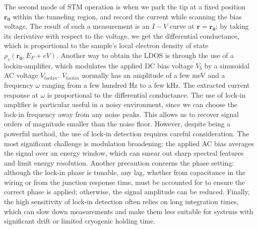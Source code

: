 The second mode of \ac{STM} operation is when we park the tip at a fixed position $\mathbf{r_0}$ within the tunneling region, and record the current while scanning the bias voltage. The result of such a measurement is an $I-V$ curve at $\mathbf{r} = \mathbf{r_0}$; by taking its derivative with respect to the voltage, we get the differential conductance, which is proportional to the sample's local electron density of state $\rho_s(\mathbf{r_0}, E_F+eV)$. Another way to obtain the LDOS is through the use of a lockin-amplifier, which modulates the applied DC bias voltage $V_b$ by a sinusoidal AC voltage $V_{lockin}$.  $V_{lockin}$ normally has an amplitude of a few meV and a frequency $\omega$ ranging from a few hundred Hz to a few kHz. The extracted current response at $\omega$ is proportional to the differential conductance. The use of lock-in amplifier is particular useful in a noisy environment, since we can choose the lock-in frequency away from any noise peaks. This allows us to recover signal orders of magnitude smaller than the noise floor. However, despite being a powerful method, the use of lock-in detection requires careful consideration. The most significant challenge is modulation broadening: the applied AC bias averages the signal over an energy window, which can smear out sharp spectral features and limit energy resolution. Another precaution concerns the phase setting: although the lock-in phase is tunable, any lag, whether from capacitance in the wiring or from the junction response time, must be accounted for to ensure the correct phase is applied; otherwise, the signal amplitude can be reduced. Finally, the high sensitivity of lock-in detection often relies on long integration times, which can slow down measurements and make them less suitable for systems with significant drift or limited cryogenic holding time.

